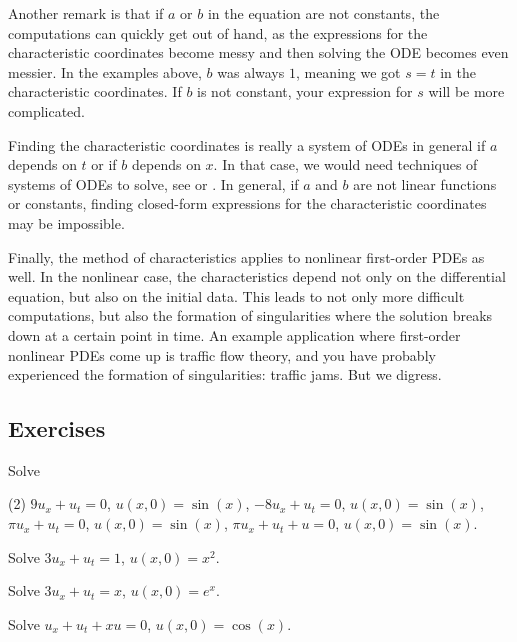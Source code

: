 Another remark is that if $a$ or $b$ in the equation are not constants,
the computations can
quickly get out of hand, as the expressions for the characteristic
coordinates become messy and then solving the ODE becomes even messier.
In the examples above, $b$ was always $1$, meaning we got $s=t$ in the
characteristic coordinates.  If $b$ is not constant, your expression for $s$
will be more complicated.

Finding the characteristic coordinates is really
a system of ODEs in general if $a$ depends on $t$ or if $b$ depends on $x$.
In that case, we would need techniques of systems of ODEs
to solve, see  or .  In
general, if $a$ and $b$ are not linear functions or constants, finding
closed-form expressions for the characteristic coordinates may be impossible.

Finally, the method of characteristics applies to nonlinear
first-order PDEs
as well.  In the nonlinear case, the characteristics depend not only
on the differential equation, but also on the initial data.  This leads to
not only more difficult computations, but also the formation of
singularities where the solution breaks down at a certain point in time.
An example application where first-order nonlinear PDEs come
up is traffic flow theory, and you have probably experienced the
formation of singularities: traffic jams.  But we digress.

\subsection{Exercises}

\begin{exercise}
Solve
\begin{tasks}(2)
\task $9u_x + u_t = 0$, \enspace $u(x,0) = \sin(x)$,
\task $-8u_x + u_t = 0$, \enspace $u(x,0) = \sin(x)$,
\task $\pi u_x + u_t = 0$, \enspace $u(x,0) = \sin(x)$,
\task $\pi u_x + u_t + u = 0$, \enspace $u(x,0) = \sin(x)$.
\end{tasks}
\end{exercise}

\begin{exercise}
Solve $3u_x + u_t = 1$, $u(x,0) = x^2$.
\end{exercise}

\begin{exercise}
Solve $3u_x + u_t = x$, $u(x,0) = e^x$.
\end{exercise}

\begin{exercise}
Solve $u_x+u_t+xu = 0$, $u(x,0) = \cos(x)$.
\end{exercise}


